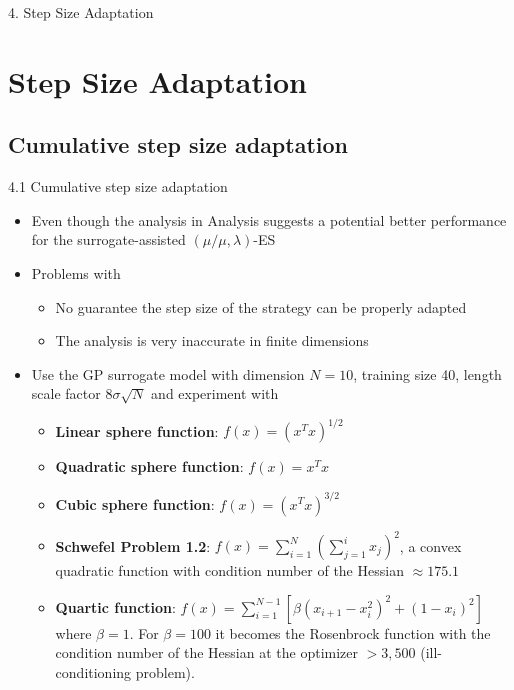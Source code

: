 \documentclass{beamer}
\begin{document}
\begin{frame}[plain,c]
\begin{center}
\Huge 4. Step Size Adaptation
\end{center}
\end{frame}
\section{Step Size Adaptation}
\subsection{Cumulative step size adaptation}
\begin{frame}{4.1 Cumulative step size adaptation}
\begin{itemize}
    \item Even though the analysis in Analysis suggests a potential better performance for the surrogate-assisted $(\mu/\mu, \lambda)$-ES
    \item Problems with 
    \begin{itemize}
        \item No guarantee the step size of the strategy can be properly adapted
        \item The analysis is very inaccurate in finite dimensions
    \end{itemize}
    \item Use the GP surrogate model with dimension $N=10$, training size 40, length scale factor $8 \sigma \sqrt{N}$ and experiment with 
    \begin{itemize}
        \item \textbf{Linear sphere function}: $f(x) = (x^Tx)^{1/2}$ 
        \item \textbf{Quadratic sphere function}: $f(x) = x^Tx$ 
        \item \textbf{Cubic sphere function}: $f(x) = (x^Tx)^{3/2}$  
        \item \textbf{Schwefel Problem 1.2}: $f(x) = \sum_{i=1}^N(\sum_{j=1}^i x_j)^2$, a convex quadratic function with condition number of the Hessian $\approx175.1$
        \item \textbf{Quartic function}: $f(x) = \sum_{i=1}^{N-1} \left[ \beta(x_{i+1} -x_i^2)^2 + (1-x_i)^2 \right]$ where $\beta = 1$. For $\beta=100$ it becomes the Rosenbrock function with the condition number of the Hessian at the optimizer $>3,500$ (ill-conditioning problem).
    \end{itemize}
\end{itemize}
\end{frame}
\end{document}
